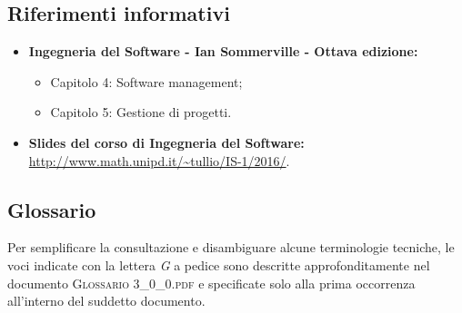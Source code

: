 \subsection{Riferimenti informativi}
\begin{itemize}
\item \textbf{Ingegneria del Software - Ian Sommerville - Ottava edizione:}
	\begin{itemize}
		\item Capitolo 4: Software management;
		\item Capitolo 5: Gestione di progetti.
	\end{itemize}
\item \textbf{Slides del corso di Ingegneria del Software:}\\
\url{http://www.math.unipd.it/~tullio/IS-1/2016/}.
\end{itemize}

\subsection{Glossario}
Per semplificare la consultazione e disambiguare alcune terminologie tecniche, le voci indicate con la lettera \textit{G} a pedice sono descritte approfonditamente nel documento \textsc{Glossario 3\_0\_0.pdf} e specificate solo alla prima occorrenza all'interno del suddetto documento.